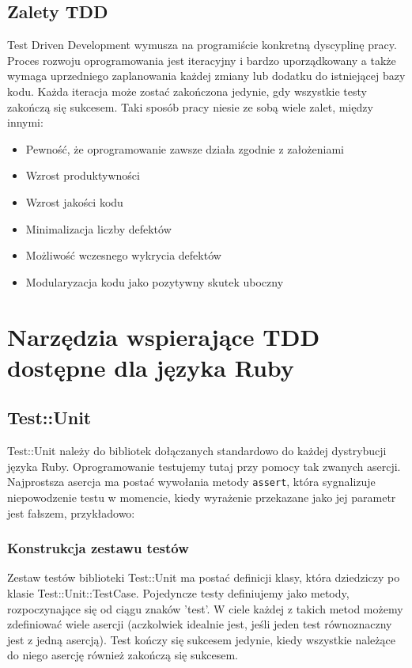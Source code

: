   \subsection{Zalety TDD}
    Test Driven Development wymusza na programiście konkretną dyscyplinę pracy. Proces rozwoju oprogramowania jest iteracyjny i bardzo uporządkowany a także wymaga uprzedniego zaplanowania każdej zmiany lub dodatku do istniejącej bazy kodu. Każda iteracja może zostać zakończona jedynie, gdy wszystkie testy zakończą się sukcesem. Taki sposób pracy niesie ze sobą wiele zalet, między innymi:
     
    \begin{itemize}
      \item Pewność, że oprogramowanie zawsze działa zgodnie z założeniami
      \item Wzrost produktywności
      \item Wzrost jakości kodu
      \item Minimalizacja liczby defektów
      \item Możliwość wczesnego wykrycia defektów
      \item Modularyzacja kodu jako pozytywny skutek uboczny
    \end{itemize}

  \section{Narzędzia wspierające TDD dostępne dla języka Ruby}
    
    \subsection{Test::Unit}
    
    Test::Unit należy do bibliotek dołączanych standardowo do każdej dystrybucji języka Ruby. Oprogramowanie testujemy tutaj przy pomocy tak zwanych asercji. Najprostsza asercja ma postać wywołania metody \verb+assert+, która sygnalizuje niepowodzenie testu w momencie, kiedy wyrażenie przekazane jako jej parametr jest fałszem, przykładowo:
    
    
     
     \subsubsection{Konstrukcja zestawu testów}
     Zestaw testów biblioteki Test::Unit ma postać definicji klasy, która dziedziczy po klasie Test::Unit::TestCase. Pojedyncze testy definiujemy jako metody, rozpoczynające się od ciągu znaków 'test'. W ciele każdej z takich metod możemy zdefiniować wiele asercji (aczkolwiek idealnie jest, jeśli jeden test równoznaczny jest z jedną asercją). Test kończy się sukcesem jedynie, kiedy wszystkie należące do niego asercję również zakończą się sukcesem.
     

